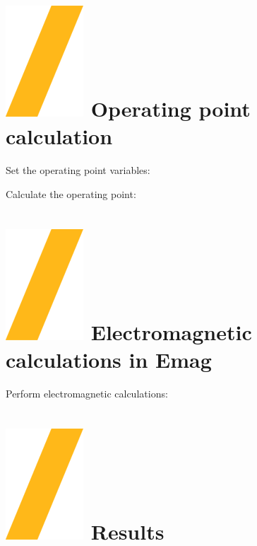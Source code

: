 \documentclass[landscape]{article}
\begin{document}
\begin{multicols}{3}
\section{\includegraphics[height=\fontcharht\font`\S]{slash.png} Operating point calculation}
Set the operating point variables:

Calculate the operating point:

\section{\includegraphics[height=\fontcharht\font`\S]{slash.png} Electromagnetic calculations in Emag}
Perform electromagnetic calculations:

\section{\includegraphics[height=\fontcharht\font`\S]{slash.png} Results}


\end{multicols}
\end{document}

